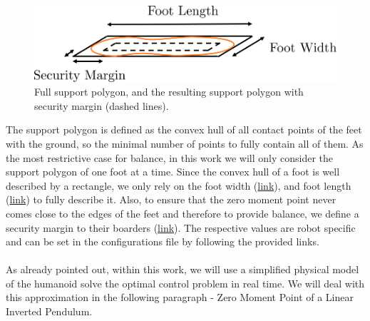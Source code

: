 \begin{figure}[h]
	\centering
	\includegraphics[scale=.5]{chapters/03_background/img/support_polygon.png}
	\caption{Full support polygon, and the resulting support polygon with security margin (dashed lines).}
	\label{fig::311_support_polygon}
\end{figure}
The support polygon is defined as the convex hull of all contact points of the feet with the ground, so the minimal number of points to fully contain all of them. As the most restrictive case for balance, in this work we will only consider the support polygon of one foot at a time. Since the convex hull of a foot is well described by a rectangle, we only rely on the foot width (\href{https://github.com/mhubii/nmpc_pattern_generator/blob/bc79a6d4f9bcfd3794146355af44429f5b7a9fe0/libs/pattern_generator/configs.yaml#L14}{link}), and foot length (\href{https://github.com/mhubii/nmpc_pattern_generator/blob/bc79a6d4f9bcfd3794146355af44429f5b7a9fe0/libs/pattern_generator/configs.yaml#L15}{link}) to fully describe it. Also, to ensure that the zero moment point never comes close to the edges of the feet and therefore to provide balance, we define a security margin to their boarders (\href{https://github.com/mhubii/nmpc_pattern_generator/blob/bc79a6d4f9bcfd3794146355af44429f5b7a9fe0/libs/pattern_generator/configs.yaml#L3}{link}). The respective values are robot specific and can be set in the configurations file by following the provided links.
\\\\
As already pointed out, within this work, we will use a simplified physical model of the humanoid solve the optimal control problem in real time. We will deal with this approximation in the following paragraph - Zero Moment Point of a Linear Inverted Pendulum.
